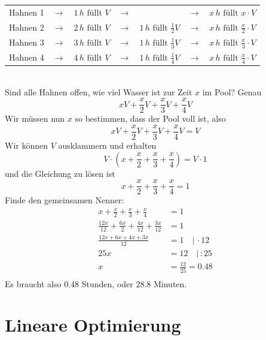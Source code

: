 \documentclass[%
11pt,%
twoside,%
titlepage,%
german,%
headsepline%
]{scrartcl}
\begin{document}
{\begin{enumerate}[a)]
\begin{tabular}{lllllll}
                                                Hahnen 1 & $\rightarrow$ &  $1\,h \mbox{ füllt } V$ & $\rightarrow$ & & $\rightarrow$ & $x\, h \mbox{ füllt } x\cdot V$\\
                                                Hahnen 2 & $\rightarrow$ &  $2\,h \mbox{ füllt } V$ &$\rightarrow$ &$1\,h \mbox{ füllt } \frac{1}{2} V$ & $\rightarrow$ & $x\, h \mbox{ füllt } \frac{x}{2}\cdot V$\\
                                                Hahnen 3 & $\rightarrow$ &  $3\,h \mbox{ füllt } V$ &$\rightarrow$ &$1\,h \mbox{ füllt } \frac{1}{3} V$ & $\rightarrow$ & $x\, h \mbox{ füllt } \frac{x}{3}\cdot V$\\
                                                Hahnen 4 & $\rightarrow$ &  $4\,h \mbox{ füllt } V$ &$\rightarrow$ &$1\,h \mbox{ füllt } \frac{1}{4} V$ & $\rightarrow$ & $x\, h \mbox{ füllt } \frac{x}{4}\cdot V$\\
                                \end{tabular}\\
                                Sind alle Hahnen offen, wie viel Wasser ist zur Zeit $x$ im Pool? Genau $$x V+\frac{x}{2}V+\frac{x}{3}V+\frac{x}{4}V$$ Wir müssen nun $x$ so bestimmen, dass der Pool voll ist, also $$x V+\frac{x}{2}V+\frac{x}{3}V+\frac{x}{4}V=V$$ Wir können $V$ ausklammern und erhalten $${V}\cdot (x +\frac{x}{2}+\frac{x}{3}+\frac{x}{4})={V}\cdot 1$$ und die Gleichung zu lösen ist $${x +\frac{x}{2}+\frac{x}{3}+\frac{x}{4}=1}$$ Finde den gemeinsamen Nenner:
                                \begin{align*}
                                x +\frac{x}{2}+\frac{x}{3}+\frac{x}{4} & =1\\
                                \frac{12x}{12}+\frac{6x}{2}+\frac{4x}{12}+\frac{3x}{12} & =1 \\
                                \frac{12x+6x+4x+3x}{12} & = 1 \quad | \, \cdot 12\\
                                25x & = 12 \quad | \, :25\\
                                x & =\frac{12}{25}={0.48}\\
                                \end{align*}
                                Es braucht also $0.48$ Stunden, oder $28.8$ Minuten. 
                \end{enumerate}
}

\section{Lineare Optimierung}
\end{document}
